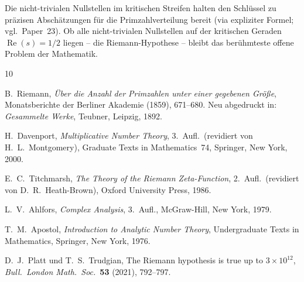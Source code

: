 \documentclass[12pt,a4paper]{amsart}
\theoremstyle{definition}
\DeclareMathOperator{\Re}{Re}
\begin{document}
Die nicht-trivialen Nullstellen im kritischen Streifen halten den Schl\"ussel
zu pr\"azisen Absch\"atzungen f\"ur die Primzahlverteilung bereit
(via expliziter Formel; vgl.\ Paper~23).
Ob alle nicht-trivialen Nullstellen auf der kritischen Geraden $\Re(s) = 1/2$
liegen -- die Riemann-Hypothese -- bleibt das ber\"uhmteste offene Problem
der Mathematik.

\begin{thebibliography}{10}

B.~Riemann,
\emph{\"Uber die Anzahl der Primzahlen unter einer gegebenen Gr\"o\ss e},
Monatsberichte der Berliner Akademie (1859), 671--680.
Neu abgedruckt in: \emph{Gesammelte Werke}, Teubner, Leipzig, 1892.

H.~Davenport,
\emph{Multiplicative Number Theory}, 3.~Aufl.\
(revidiert von H.~L.~Montgomery),
Graduate Texts in Mathematics~74,
Springer, New York, 2000.

E.~C.~Titchmarsh,
\emph{The Theory of the Riemann Zeta-Function}, 2.~Aufl.\
(revidiert von D.~R.~Heath-Brown),
Oxford University Press, 1986.

L.~V.~Ahlfors,
\emph{Complex Analysis}, 3.~Aufl.,
McGraw-Hill, New York, 1979.

T.~M.~Apostol,
\emph{Introduction to Analytic Number Theory},
Undergraduate Texts in Mathematics,
Springer, New York, 1976.

D.~J.~Platt und T.~S.~Trudgian,
The Riemann hypothesis is true up to $3 \times 10^{12}$,
\emph{Bull.\ London Math.\ Soc.}\ \textbf{53} (2021), 792--797.

\end{thebibliography}
\end{document}
